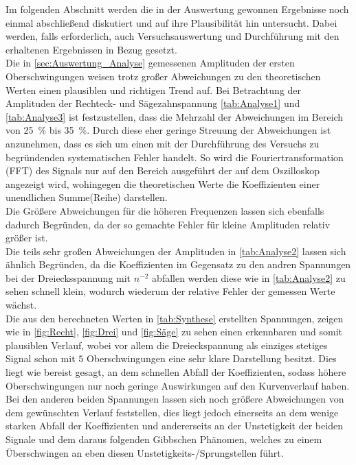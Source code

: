 Im folgenden Abschnitt werden die in der Auswertung gewonnen Ergebnisse
noch einmal abschließend diskutiert und auf ihre Plausibilität hin untersucht.
Dabei werden, falls erforderlich, auch Versuchsauswertung und Durchführung
mit den erhaltenen Ergebnissen in Bezug gesetzt.\\

Die in  \cref{sec:Auswertung_Analyse} gemessenen Amplituden der ersten 
Oberschwingungen weisen trotz großer Abweichungen zu den theoretischen
Werten einen plausiblen und richtigen Trend auf. Bei Betrachtung der 
Amplituden der Rechteck- und Sägezahnspannung \cref{tab:Analyse1} und 
\ref{tab:Analyse3} ist festzustellen, dass die Mehrzahl der Abweichungen 
im Bereich von \SI{25}{\percent} bis \SI{35}{\percent}. Durch diese
eher geringe Streuung der Abweichungen ist anzunehmen, dass es sich um
einen mit der Durchführung des Versuchs zu begründenden systematischen
Fehler handelt. 
So wird die Fouriertransformation (FFT) des Signals nur auf den Bereich
ausgeführt der auf dem Oszilloskop angezeigt wird, wohingegen die 
theoretischen Werte die Koeffizienten einer unendlichen Summe(Reihe) 
darstellen.\\
Die Größere Abweichungen für die höheren Frequenzen lassen sich ebenfalls 
dadurch Begründen, da der so gemachte Fehler für kleine Amplituden 
relativ größer ist.\\
Die teils sehr großen Abweichungen der Amplituden in \cref{tab:Analyse2} 
lassen sich ähnlich Begründen, da die Koeffizienten im Gegensatz zu den 
andren Spannungen bei der Dreiecksspannung mit $n^{-2}$ abfallen 
werden diese wie in \cref{tab:Analyse2} zu sehen schnell klein, wodurch wiederum 
der relative Fehler der gemessen Werte wächst.\\

Die aus den berechneten Werten in \cref{tab:Synthese} erstellten Spannungen,
zeigen wie in \cref{fig:Recht}, \ref{fig:Drei} und \ref{fig:Säge} zu sehen 
einen erkennbaren und somit plausiblen Verlauf, wobei vor allem die Dreieckspannung
als einziges stetiges Signal schon mit $5$ Oberschwingungen eine sehr klare Darstellung 
besitzt. Dies liegt wie bereist gesagt, an dem schnellen Abfall der Koeffizienten, sodass 
höhere Oberschwingungen nur noch geringe Auswirkungen auf den Kurvenverlauf haben.
Bei den anderen beiden Spannungen lassen sich noch größere Abweichungen von dem gewünschten 
Verlauf feststellen, dies liegt jedoch einerseits an dem wenige starken Abfall der 
Koeffizienten und andererseits an der Unstetigkeit der beiden Signale und dem daraus folgenden
Gibbschen Phänomen, welches zu einem Überschwingen an eben diesen Unstetigkeits-/Sprungstellen
führt.          